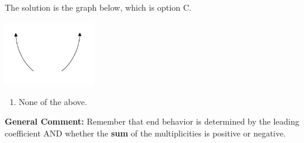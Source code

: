 \documentclass{extbook}[14pt]
\begin{document}
\begin{enumerate}
{The solution is the graph below, which is option C.
\begin{center}
    \includegraphics[width=0.3\textwidth]{../Figures/polyEndBehaviorCA.png}
\end{center}\begin{enumerate}[label=\Alph*.]
\item None of the above.\end{enumerate}
\textbf{General Comment:} Remember that end behavior is determined by the leading coefficient AND whether the \textbf{sum} of the multiplicities is positive or negative.
}
\end{enumerate}
\end{document}
